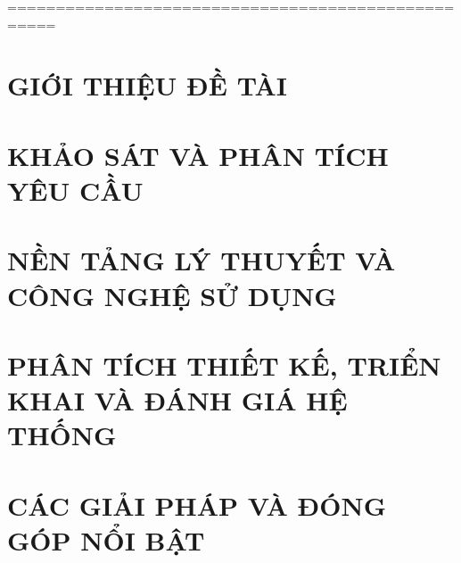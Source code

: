 \documentclass[a4paper,13pt,3p,twoside]{report}
\theoremstyle{definition}
\begin{document}
\glsaddall 
\renewcommand*{\glossaryname}{Danh sách thuật ngữ}
\renewcommand*{\acronymname}{DANH MỤC THUẬT NGỮ VÀ TỪ VIẾT TẮT}
\renewcommand*{\entryname}{Thuật ngữ}
\renewcommand*{\descriptionname}{Ý nghĩa}


% 
% 

===================================================


\newpage
{}

\pagestyle{fancy}
\fancyhf{}
\fancyhead[RE, LO]{\leftmark}
\fancyfoot[RE, LO]{\thepage}

\chapter{GIỚI THIỆU ĐỀ TÀI}
\label{chapter:Introduction}

\newpage
\chapter{KHẢO SÁT VÀ PHÂN TÍCH YÊU CẦU}
\label{chapter:Related_works}



\newpage
\chapter{NỀN TẢNG LÝ THUYẾT VÀ CÔNG NGHỆ SỬ DỤNG}
\label{chapter:Methodology}


\newpage
\chapter{PHÂN TÍCH THIẾT KẾ, TRIỂN KHAI VÀ ĐÁNH GIÁ HỆ THỐNG}
\label{chapter:Experiment}


\newpage
\chapter{CÁC GIẢI PHÁP VÀ ĐÓNG GÓP NỔI BẬT}
\label{chapter:SolutionAndContribution}

\newpage
\end{document}
